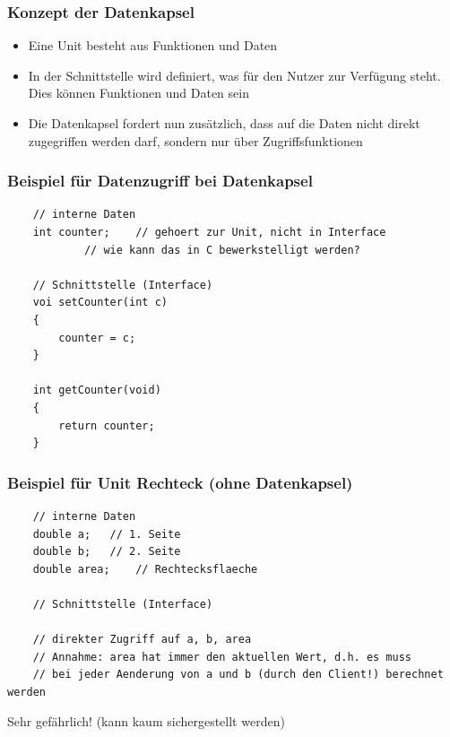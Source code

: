 \subsubsection{Konzept der Datenkapsel}
\label{sec:Konzept der Datenkapsel}
\begin{itemize}
	\item Eine Unit besteht aus Funktionen und Daten
	\item In der Schnittstelle wird definiert, was für den Nutzer zur Verfügung steht. Dies können Funktionen und Daten sein
	\item Die Datenkapsel fordert nun zusätzlich, dass auf die Daten nicht direkt zugegriffen werden darf, sondern nur über Zugriffsfunktionen
\end{itemize}

\subsubsection{Beispiel für Datenzugriff bei Datenkapsel}
\label{sec:Beispiel fuer Datenzugriff bei Datenkapsel}
\noindent
\begin{minipage}{\linewidth}
	\begin{lstlisting}
	// interne Daten
	int counter;	// gehoert zur Unit, nicht in Interface
			// wie kann das in C bewerkstelligt werden?
		
	// Schnittstelle (Interface)
	voi setCounter(int c)
	{
		counter = c;
	}
	
	int getCounter(void)
	{
		return counter;
	}
	\end{lstlisting}
\end{minipage}

\subsubsection{Beispiel für Unit Rechteck (ohne Datenkapsel)}
\label{sec:Beispiel fuer Unit Rechteck (ohne Datenkapsel)}
\noindent
\begin{minipage}{\linewidth}
	\begin{lstlisting}
	// interne Daten
	double a;	// 1. Seite
	double b;	// 2. Seite
	double area;	// Rechtecksflaeche
	
	// Schnittstelle (Interface)
	
	// direkter Zugriff auf a, b, area
	// Annahme: area hat immer den aktuellen Wert, d.h. es muss
	// bei jeder Aenderung von a und b (durch den Client!) berechnet werden
	\end{lstlisting}
\end{minipage}
\begin{achtung}
	Sehr gefährlich! (kann kaum sichergestellt werden)
\end{achtung}

